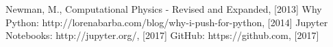 \documentclass[%
 reprint,
 amsmath,amssymb,
 aps,
]{revtex4-1}
\begin{document}










\begin{thebibliography}{}
 Newman, M., Computational Physics - Revised and Expanded, [2013] 
 Why Python: http://lorenabarba.com/blog/why-i-push-for-python, [2014]
 Jupyter Notebooks: http://jupyter.org/, [2017]
 GitHub: https://github.com, [2017]
\end{thebibliography}
\end{document}
